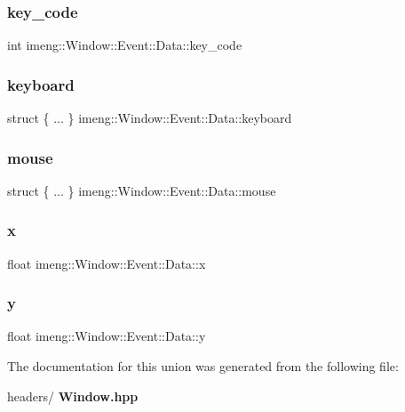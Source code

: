 \subsubsection{key\_code}
{\footnotesize\ttfamily int imeng\+::\+Window\+::\+Event\+::\+Data\+::key\+\_\+code}

\mbox{\label{unionimeng_1_1_window_1_1_event_1_1_data_a730f6acec102696cc938395d5bfed126}} 
\subsubsection{keyboard}
{\footnotesize\ttfamily struct \{ ... \}   imeng\+::\+Window\+::\+Event\+::\+Data\+::keyboard}

\mbox{\label{unionimeng_1_1_window_1_1_event_1_1_data_a5ee20d8b070015a1a17a1e0624f3001a}} 
\subsubsection{mouse}
{\footnotesize\ttfamily struct \{ ... \} 
				 imeng\+::\+Window\+::\+Event\+::\+Data\+::mouse}

\mbox{\label{unionimeng_1_1_window_1_1_event_1_1_data_a5dada0e38c8b73b501190a614057683a}} 
\subsubsection{x}
{\footnotesize\ttfamily float imeng\+::\+Window\+::\+Event\+::\+Data\+::x}

\mbox{\label{unionimeng_1_1_window_1_1_event_1_1_data_aefd134b195cf0d76556e9f97ddf3c8c6}} 
\subsubsection{y}
{\footnotesize\ttfamily float imeng\+::\+Window\+::\+Event\+::\+Data\+::y}



The documentation for this union was generated from the following file\+:\begin{DoxyCompactItemize}
\item 
headers/\textbf{ Window.\+hpp}\end{DoxyCompactItemize}
